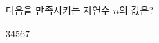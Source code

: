 \hspace*{2mm}\begin{minipage}[t]{\dimexpr\linewidth-2mm\relax}\vspace{0pt}
다음을 만족시키는 자연수 $n$의 값은? 
\begin{choices32}{$3$}{$4$}{$5$}{$6$}{$7$}\end{choices32}\end{minipage}
